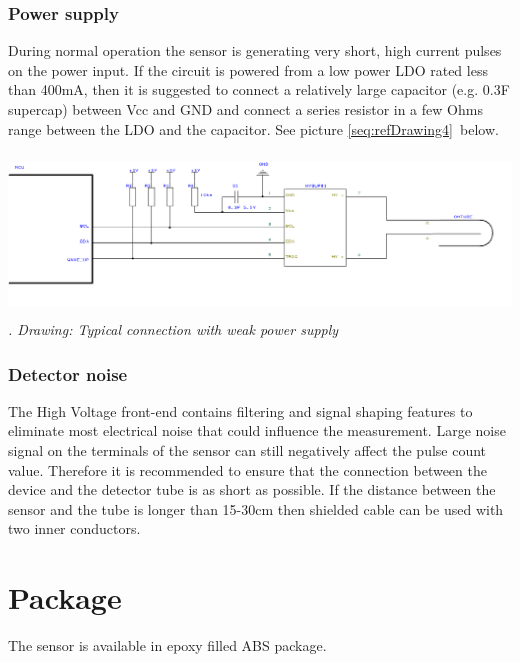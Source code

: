 \documentclass[a4paper]{article}
\newcounter{Drawing}
\renewcommand\theDrawing{\arabic{Drawing}}
\begin{document}
\subsubsection{Power supply}
\hypertarget{RefHeadingToc13044280169782}{}During normal operation the sensor is generating very short, high current
pulses on the power input. If the circuit is powered from a low power LDO rated less than 400mA, then it is suggested
to connect a relatively large capacitor (e.g. 0.3F supercap) between Vcc and GND and connect a series resistor in a few
Ohms range between the LDO and the capacitor. See picture \ref{seq:refDrawing4}\ below.



\begin{center}
\begin{minipage}{6.6953in}
{\itshape
 \includegraphics[width=6.6953in,height=1.6898in]{HVSUP01UM-img005.png}
{\theDrawing\label{seq:refDrawing4}}. Drawing: Typical connection with weak power supply}
\end{minipage}
\end{center}
\subsubsection[Detector noise]{ Detector noise}
\hypertarget{RefHeadingToc4061383566216}{}The High Voltage front-end contains filtering and signal shaping features to
eliminate most electrical noise that could influence the measurement. Large noise signal on the terminals of the sensor
can still negatively affect the pulse count value. Therefore it is recommended to ensure that the connection between
the device and the detector tube is as short as possible. If the distance between the sensor and the tube is longer
than 15-30cm then shielded cable can be used with two inner conductors.

\clearpage\section[Package]{ Package}
\hypertarget{RefHeadingToc1411383566216}{}{
The sensor is available in epoxy filled ABS package.}
\end{document}
